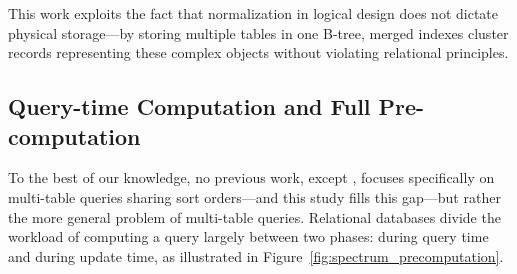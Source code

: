 \documentclass[sigconf, pdfa, nonacm]{acmart}
\begin{document}
This work exploits the fact that normalization in logical design does not dictate physical storage---by storing multiple tables in one B-tree, merged indexes cluster records representing these complex objects without violating relational principles.

\subsection{Query-time Computation and Full Pre-computation}\label{subsec:precomputation_vs_querytime}

To the best of our knowledge, no previous work, except \citet{selinger1979access}, focuses specifically on multi-table queries sharing sort orders---and this study fills this gap---but rather the more general problem of multi-table queries.
Relational databases divide the workload of computing a query largely between two phases: during query time and during update time, as illustrated in Figure~\ref{fig:spectrum_precomputation}.
\end{document}
